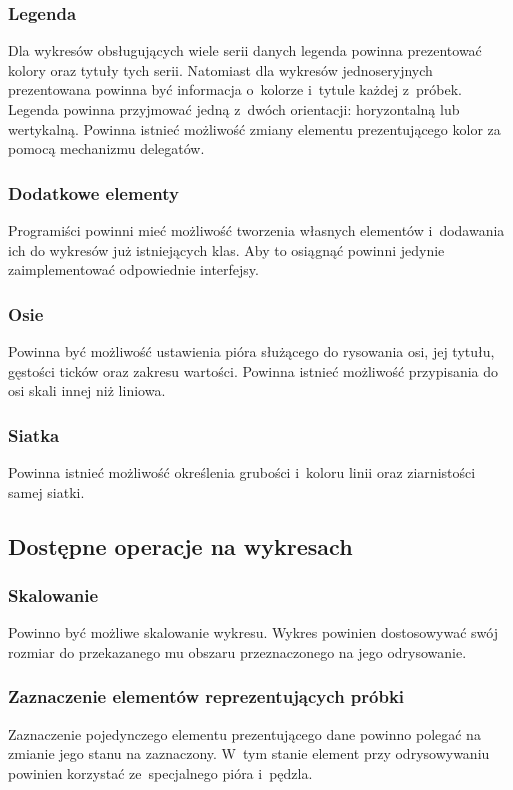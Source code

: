 \subsubsection{Legenda}
Dla wykresów obsługujących wiele serii danych legenda powinna prezentować kolory oraz tytuły tych serii. Natomiast dla wykresów jednoseryjnych prezentowana powinna być informacja o~kolorze i~tytule każdej z~próbek. Legenda powinna przyjmować jedną z~dwóch orientacji: horyzontalną lub wertykalną. Powinna istnieć możliwość zmiany elementu prezentującego kolor za pomocą mechanizmu delegatów.

\subsubsection{Dodatkowe elementy}
Programiści powinni mieć możliwość tworzenia własnych elementów i~dodawania ich do wykresów już istniejących klas. Aby to osiągnąć powinni jedynie zaimplementować odpowiednie interfejsy.

\subsubsection{Osie}
Powinna być możliwość ustawienia pióra służącego do rysowania osi, jej tytułu, gęstości ticków oraz zakresu wartości. Powinna istnieć możliwość przypisania do osi skali innej niż liniowa.

\subsubsection{Siatka}
Powinna istnieć możliwość określenia grubości i~koloru linii oraz ziarnistości samej siatki.

\subsection{Dostępne operacje na wykresach}
\subsubsection{Skalowanie}
Powinno być możliwe skalowanie wykresu. Wykres powinien dostosowywać swój rozmiar do przekazanego mu obszaru przeznaczonego na jego odrysowanie.

\subsubsection{Zaznaczenie elementów reprezentujących próbki}
Zaznaczenie pojedynczego elementu prezentującego dane powinno polegać na zmianie jego stanu na zaznaczony. W~tym stanie element przy odrysowywaniu powinien korzystać ze~specjalnego pióra i~pędzla.


